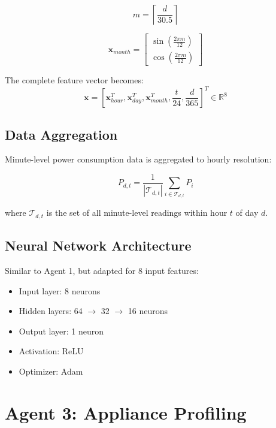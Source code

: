 \documentclass[conference]{IEEEtran}
\begin{document}
\begin{equation}
m = \left\lceil \frac{d}{30.5} \right\rceil
\end{equation}

\begin{equation}
\mathbf{x}_{month} = \begin{bmatrix}
\sin\left(\frac{2\pi m}{12}\right) \\
\cos\left(\frac{2\pi m}{12}\right)
\end{bmatrix}
\end{equation}

The complete feature vector becomes:
\begin{equation}
\mathbf{x} = \left[\mathbf{x}_{hour}^T, \mathbf{x}_{day}^T, \mathbf{x}_{month}^T, \frac{t}{24}, \frac{d}{365}\right]^T \in \mathbb{R}^8
\end{equation}

\subsection{Data Aggregation}
Minute-level power consumption data is aggregated to hourly resolution:

\begin{equation}
P_{d,t} = \frac{1}{|\mathcal{T}_{d,t}|}\sum_{i \in \mathcal{T}_{d,t}} P_i
\end{equation}

where $\mathcal{T}_{d,t}$ is the set of all minute-level readings within hour $t$ of day $d$.

\subsection{Neural Network Architecture}
Similar to Agent 1, but adapted for 8 input features:
\begin{itemize}
    \item Input layer: 8 neurons
    \item Hidden layers: 64 $\rightarrow$ 32 $\rightarrow$ 16 neurons
    \item Output layer: 1 neuron
    \item Activation: ReLU
    \item Optimizer: Adam
\end{itemize}

\section{Agent 3: Appliance Profiling}
\end{document}
